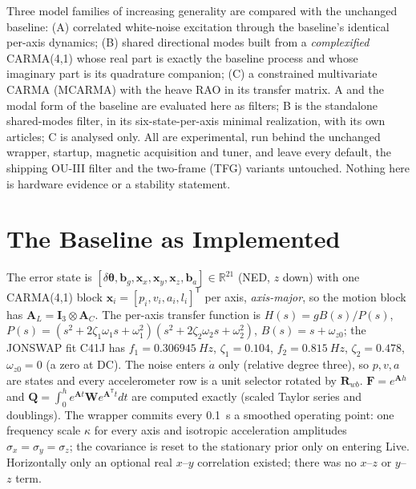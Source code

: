 \documentclass[conference]{IEEEtran}
\DeclareRobustCommand{\vct}[1]{\bm{#1}}
\DeclareRobustCommand{\mat}[1]{\bm{#1}}
\newcommand{\R}{\mathbb{R}}
\theoremstyle{bodysmall}
\begin{document}
Three model families of increasing generality are compared with the
unchanged baseline: (A) correlated white-noise excitation through the
baseline's identical per-axis dynamics; (B) shared directional modes built
from a \emph{complexified} CARMA(4,1) whose real part is exactly the
baseline process and whose imaginary part is its quadrature companion;
(C) a constrained multivariate CARMA (MCARMA) with the heave RAO in its
transfer matrix. A and the modal form of the baseline are evaluated here as
filters; B is the standalone shared-modes filter, in its six-state-per-axis
minimal realization, with its own articles; C is analysed only. All are
experimental, run behind the unchanged wrapper,
startup, magnetic acquisition and tuner, and leave every default, the
shipping OU-III filter and the two-frame (TFG) variants untouched. Nothing
here is hardware evidence or a stability statement.

\section{The Baseline as Implemented}
\label{sec:baseline}
The error state is
$[\delta\vct\theta,\vct b_g,\vct x_x,\vct x_y,\vct x_z,\vct b_a]\in\R^{21}$
(NED, $z$ down) with one CARMA(4,1) block
$\vct x_i=[p_i,v_i,a_i,l_i]^{\mathsf T}$ per axis, \emph{axis-major}, so the
motion block has $\mat A_L=\mat I_3\otimes\mat A_C$. The per-axis transfer
function is $H(s)=gB(s)/P(s)$,
$P(s)=(s^2+2\zeta_1\omega_1s+\omega_1^2)(s^2+2\zeta_2\omega_2s+\omega_2^2)$,
$B(s)=s+\omega_{z0}$; the JONSWAP fit C41J has
$f_1=\SI{0.306945}{Hz}$, $\zeta_1=0.104$, $f_2=\SI{0.815}{Hz}$,
$\zeta_2=0.478$, $\omega_{z0}=0$ (a zero at DC). The noise enters $\dot a$
only (relative degree three), so $p,v,a$ are states and every accelerometer
row is a unit selector rotated by $\mat R_{wb}$. $\mat F=e^{\mat Ah}$ and
$\mat Q=\int_0^h e^{\mat At}\mat W e^{\mat A^{\mathsf T}t}dt$ are computed
exactly (scaled Taylor series and doublings). The wrapper commits every
\SI{0.1}{s} a smoothed operating point: one frequency scale $\kappa$ for every
axis and isotropic acceleration amplitudes
$\sigma_x=\sigma_y=\sigma_z$; the covariance is reset to the stationary prior
only on entering Live. Horizontally only an optional real $x$--$y$
correlation existed; there was no $x$--$z$ or $y$--$z$ term.
\end{document}
